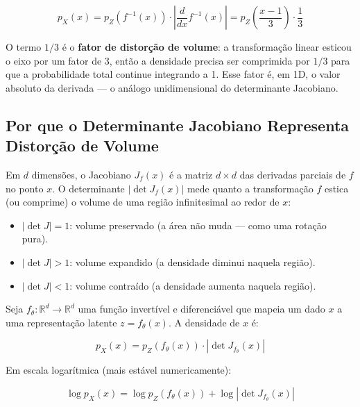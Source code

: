\documentclass{tufte-handout}
\let\subsubsection\subsection
\begin{document}
\begin{equation}
p_X(x) = p_Z(f^{-1}(x)) \cdot \left| \frac{d}{dx} f^{-1}(x) \right|
         = p_Z\!\left(\frac{x-1}{3}\right) \cdot \frac{1}{3}
\end{equation}

O termo $1/3$ é o \textbf{fator de distorção de volume}: a transformação linear esticou o eixo por um fator de 3, então a densidade precisa ser comprimida por $1/3$ para que a probabilidade total continue integrando a 1. Esse fator é, em 1D, o valor absoluto da derivada --- o análogo unidimensional do determinante Jacobiano.

\subsubsection{Por que o Determinante Jacobiano Representa Distorção de Volume}

Em $d$ dimensões, o Jacobiano $J_f(x)$ é a matriz $d \times d$ das derivadas parciais de $f$ no ponto $x$. O determinante $|\det J_f(x)|$ mede quanto a transformação $f$ estica (ou comprime) o volume de uma região infinitesimal ao redor de $x$:

\begin{itemize}
    \item $|\det J| = 1$: volume preservado (a área não muda --- como uma rotação pura).
    \item $|\det J| > 1$: volume expandido (a densidade diminui naquela região).
    \item $|\det J| < 1$: volume contraído (a densidade aumenta naquela região).
\end{itemize}

\begin{thm}
Seja $f_\theta: \mathbb{R}^d \rightarrow \mathbb{R}^d$ uma função invertível e diferenciável que mapeia um dado $x$ a uma representação latente $z = f_\theta(x)$. A densidade de $x$ é:

\begin{equation}
p_X(x) = p_Z(f_\theta(x)) \cdot \left| \det J_{f_\theta}(x) \right|
\end{equation}

Em escala logarítmica (mais estável numericamente):

\begin{equation}
\log p_X(x) = \log p_Z(f_\theta(x)) + \log \left| \det J_{f_\theta}(x) \right|
\end{equation}
\end{thm}
\end{document}
